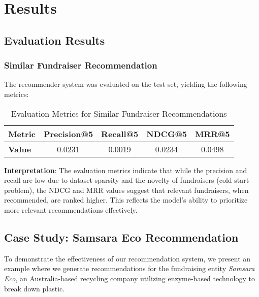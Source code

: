 \documentclass[sigconf]{acmart}
\begin{document}
\section{Results}

\subsection{Evaluation Results}

\subsubsection{Similar Fundraiser Recommendation}

The recommender system was evaluated on the test set, yielding the following metrics:

\begin{table}[htpb]
    \centering
    \caption{Evaluation Metrics for Similar Fundraiser Recommendations}
    \label{tab:evaluation_metrics}
    \begin{tabular}{lcccc}
        \toprule
        \textbf{Metric} & \textbf{Precision@5} & \textbf{Recall@5} & \textbf{NDCG@5} & \textbf{MRR@5} \\
        \midrule
        \textbf{Value} & 0.0231 & 0.0019 & 0.0234 & 0.0498 \\
        \bottomrule
    \end{tabular}
\end{table}

\textbf{Interpretation}: The evaluation metrics indicate that while the precision and recall are low due to dataset sparsity and the novelty of fundraisers (cold-start problem), the NDCG and MRR values suggest that relevant fundraisers, when recommended, are ranked higher. This reflects the model's ability to prioritize more relevant recommendations effectively.

\subsection{Case Study: Samsara Eco Recommendation}

To demonstrate the effectiveness of our recommendation system, we present an example where we generate recommendations for the fundraising entity \textit{Samsara Eco}, an Australia-based recycling company utilizing enzyme-based technology to break down plastic.
\end{document}
